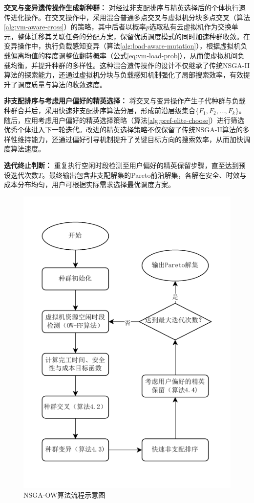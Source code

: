 \textbf{交叉与变异遗传操作生成新种群：}
对经过非支配排序与精英选择后的个体执行遗传进化操作。在交叉操作中，采用混合普通多点交叉与虚拟机分块多点交叉（算法\ref{alg:vm-aware-cross}）的策略，其中后者以概率$p$选取私有云虚拟机作为交换单元，整体迁移其关联任务的分配方案，保留优质调度模式的同时加速种群收敛。在变异操作中，执行负载感知变异（算法\ref{alg:load-aware-mutation}），根据虚拟机负载偏离均值的程度调整位翻转概率（公式\eqref{eq:vm-load-prob}），从而使虚拟机间负载均衡，并提升种群的多样性。这种混合遗传操作的设计不仅继承了传统NSGA-II算法的探索能力，还通过虚拟机分块与负载感知机制强化了局部搜索效率，有效提升了调度质量与算法的收敛速度。

\textbf{非支配排序与考虑用户偏好的精英选择：}
将交叉与变异操作产生子代种群与负载种群合并后，采用快速非支配排序算法分层，形成前沿层级集合$\{F_1, F_2,...,F_k\}$。随后，应用考虑用户偏好的精英选择策略（算法\ref{alg:pref-elite-choose}）进行筛选优秀个体进入下一轮迭代。改进的精英选择策略不仅保留了传统NSGA-II算法的多样性维持能力，还通过偏好引导机制提升了关键目标方向的搜索效率，从而加快调度算法速度。

\textbf{迭代终止判断：}
重复执行空闲时段检测至用户偏好的精英保留步骤，直至达到预设迭代次数$T$。最终输出包含非支配解集的Pareto前沿解集，各解在安全、时效与成本分布均匀，用户可根据实际需求选择最优调度方案。

\begin{figure}
    \includegraphics{img/nsgaow流程图.drawio.pdf}
    \caption{NSGA-OW算法流程示意图}\label{fig:mhalg-flow}
\end{figure}

